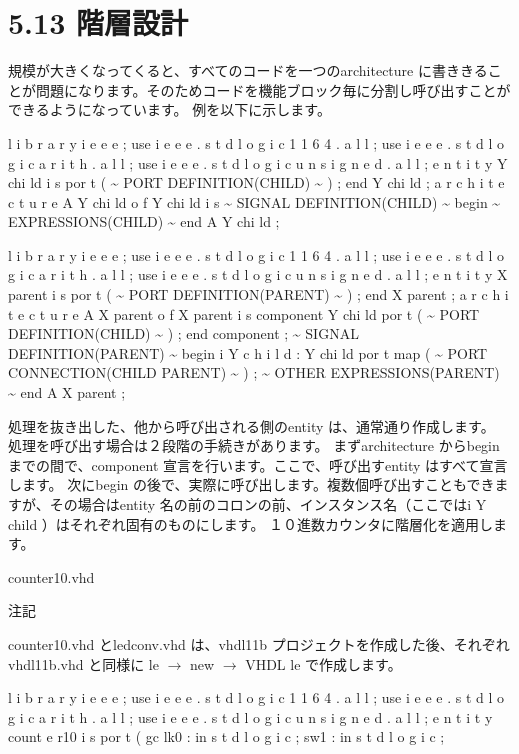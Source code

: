 \documentclass[letterpaper,10pt,dvipdfmx]{sphinxmanual}
\begin{document}
\section{5.13 階層設計}
\label{05_try:id22}
規模が大きくなってくると、すべてのコードを一つのarchitecture に書ききることが問題になります。そのためコードを機能ブロック毎に分割し呼び出すことができるようになっています。
例を以下に示します。

l i b r a r y i e e e ;
use i e e e . s t d l o g i c 1 1 6 4 . a l l ;
use i e e e . s t d l o g i c a r i t h . a l l ;
use i e e e . s t d l o g i c u n s i g n e d . a l l ;
e n t i t y Y chi ld i s
por t (
\textasciitilde{} PORT DEFINITION(CHILD) \textasciitilde{}
) ;
end Y chi ld ;
a r c h i t e c t u r e A Y chi ld o f Y chi ld i s
\textasciitilde{} SIGNAL DEFINITION(CHILD) \textasciitilde{}
begin
\textasciitilde{} EXPRESSIONS(CHILD) \textasciitilde{}
end A Y chi ld ;

l i b r a r y i e e e ;
use i e e e . s t d l o g i c 1 1 6 4 . a l l ;
use i e e e . s t d l o g i c a r i t h . a l l ;
use i e e e . s t d l o g i c u n s i g n e d . a l l ;
e n t i t y X parent i s
por t (
\textasciitilde{} PORT DEFINITION(PARENT) \textasciitilde{}
) ;
end X parent ;
a r c h i t e c t u r e A X parent o f X parent i s
component Y chi ld
por t (
\textasciitilde{} PORT DEFINITION(CHILD) \textasciitilde{}
) ;
end component ;
\textasciitilde{} SIGNAL DEFINITION(PARENT) \textasciitilde{}
begin
i Y c h i l d : Y chi ld
por t map (
\textasciitilde{} PORT CONNECTION(CHILD PARENT) \textasciitilde{}
) ;
\textasciitilde{} OTHER EXPRESSIONS(PARENT) \textasciitilde{}
end A X parent ;

処理を抜き出した、他から呼び出される側のentity は、通常通り作成します。
処理を呼び出す場合は２段階の手続きがあります。
まずarchitecture からbegin までの間で、component 宣言を行います。ここで、呼び出すentity はすべて宣言します。
次にbegin の後で、実際に呼び出します。複数個呼び出すこともできますが、その場合はentity 名の前のコロンの前、インスタンス名（ここではi Y child ）はそれぞれ固有のものにします。
１０進数カウンタに階層化を適用します。

counter10.vhd

注記

counter10.vhd とledconv.vhd は、vhdl11b プロジェクトを作成した後、それぞれvhdl11b.vhd と同様に le \(\rightarrow\) new \(\rightarrow\) VHDL  le で作成します。

l i b r a r y i e e e ;
use i e e e . s t d l o g i c 1 1 6 4 . a l l ;
use i e e e . s t d l o g i c a r i t h . a l l ;
use i e e e . s t d l o g i c u n s i g n e d . a l l ;
e n t i t y count e r10 i s
por t (
gc lk0 : in s t d l o g i c ;
sw1 : in s t d l o g i c ;
\end{document}
